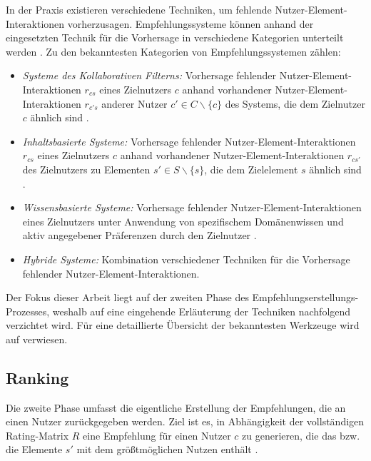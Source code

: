 In der Praxis existieren verschiedene Techniken, um fehlende Nutzer-Ele\-ment-Interaktionen vorherzusagen.
Empfehlungssysteme können anhand der eingesetzten Technik für die Vorhersage in verschiedene Kategorien unterteilt werden \cite[S. 8 ff.]{recommenderSystems:2016}.
Zu den bekanntesten Kategorien von Empfehlungssystemen zählen:
\begin{itemize}
	\item \textit{Systeme des Kollaborativen Filterns:} Vorhersage fehlender Nutzer-Element-Interaktionen $r_{cs}$ eines Zielnutzers $c$ anhand vorhandener Nutzer-Ele\-ment-Interaktionen $r_{c's}$ anderer Nutzer $c' \in C \backslash \{c\}$ des Systems, die dem Zielnutzer $c$ ähnlich sind \cite[S. 737]{adomavicius:inproceedings}.
	\item \textit{Inhaltsbasierte Systeme:} Vorhersage fehlender Nutzer-Element-Interakti\-onen $r_{cs}$ eines Zielnutzers $c$ anhand vorhandener Nutzer-Element-Inter\-aktionen $r_{cs'}$ des Zielnutzers zu Elementen $s' \in S \backslash \{s\}$, die dem Zielelement $s$ ähnlich sind \cite[S. 735]{adomavicius:inproceedings}.
	\item \textit{Wissensbasierte Systeme:} Vorhersage fehlender Nutzer-Element-Interakti\-onen eines Zielnutzers unter Anwendung von spezifischem Domänenwissen und aktiv angegebener Präferenzen durch den Zielnutzer \cite[S. 16f.]{recommenderSystems:2016}.
	\item \textit{Hybride Systeme:} Kombination verschiedener Techniken für die Vorhersage fehlender Nutzer-Element-Interaktionen.
\end{itemize}

Der Fokus dieser Arbeit liegt auf der zweiten Phase des Empfehlungserstel\-lungs-Prozesses, weshalb auf eine eingehende Erläuterung der Techniken nachfolgend verzichtet wird.
Für eine detaillierte Übersicht der bekanntesten Werkzeuge wird auf \textcite[S. 8ff.]{recommenderSystems:2016} verwiesen.

\subsection{Ranking}
\label{ch:empfehlungssysteme:empfehlungserstellung:recommendation}
Die zweite Phase umfasst die eigentliche Erstellung der Empfehlungen, die an einen Nutzer zurückgegeben werden.
Ziel ist es, in Abhängigkeit der vollständigen Rating-Matrix $R$ eine Empfehlung für einen Nutzer $c$ zu generieren, die das bzw. die Elemente $s'$ mit dem größtmöglichen Nutzen enthält \cite[S. 87]{ekstrand:article}\cite[S. 898]{adomavicius:article}.

